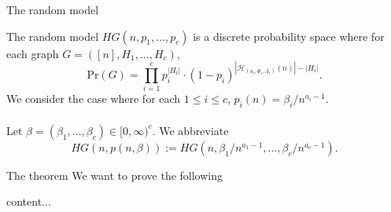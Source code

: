 \documentclass[handout, 11pt]{beamer}
\begin{document}
	\begin{frame}{The random model}

	The random model $HG(n,p_1,\dots, p_c)$ is a discrete probability space where for each graph 
	$G=([n],H_1,\dots,H_c)$,
	\[ \mathrm{Pr}(G)=\prod_{i=1}^{c} p_i^{|H_i|}\cdot (1-p_i)^{|\mathcal{H}_{(a_i,\Phi_i,A_i)}(n)|-|H_i|} . \]
	We consider the case where for each $1\leq i \leq c$,  $p_i(n)=\beta_i/n^{a_i-1}$.
	\\~\\ 
	Let $\beta=(\beta_1,\dots, \beta_c)\in [0,\infty)^c$. We abbreviate
	\[HG(n,p(n,\beta)):= HG(n,\beta_1/n^{a_1-1},\dots, \beta_c/n^{a_c-1}). \]
	
	\end{frame}
	
	\begin{frame}{The theorem}
		We want to prove the following
		
		\begin{theorem}
			content...
		\end{theorem}
		
	\end{frame}
\end{document}
